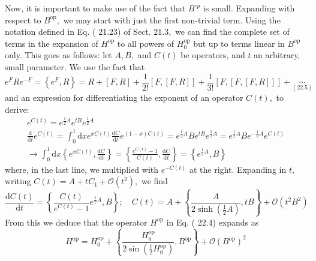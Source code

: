 \documentclass[main.tex]{subfiles}
\begin{document}
Now, it is important to make use of the fact that $B^{\circ p}$ is small. Expanding with respect to $B^{\mathrm{op}},$ we may start with just the first non-trivial term. Using the notation defined in Eq. ( 21.23) of Sect. $21.3,$ we can find the complete set of terms in the expansion of $H^{\mathrm{op}}$ to all powers of $H_{0}^{\mathrm{op}}$ but up to terms linear in $B^{\mathrm{op}}$ only. This goes as follows: let $A, B,$ and $C(t)$ be operators, and $t$ an arbitrary, small parameter. We use the fact that
$$
e^{F} R e^{-F}=\left\{e^{F}, R\right\}=R+[F, R]+\frac{1}{2 !}[F,[F, R]]+\frac{1}{3 !}[F,[F,[F, R]]]+\underset{(22.5)}{\cdots}
$$
and an expression for differentiating the exponent of an operator $C(t),$ to derive:
$$
\begin{array}{l}
{e^{C(t)}=e^{\frac{1}{2} A} e^{t B} e^{\frac{1}{2} A}} \\
{\frac{\mathrm{d}}{\mathrm{d} t} e^{C(t)}=\int_{0}^{1} \mathrm{d} x e^{x C(t)} \frac{\mathrm{d} C}{\mathrm{d} t} e^{(1-x) C(t)}=e^{\frac{1}{2} A} B e^{t B} e^{\frac{1}{2} A}=e^{\frac{1}{2} A} B e^{-\frac{1}{2} A} e^{C(t)}} \\
{\rightarrow \int_{0}^{1} \mathrm{d} x\left\{e^{x C(t)}, \frac{\mathrm{d} C}{\mathrm{d} t}\right\}=\left\{\frac{e^{C(t)}-1}{C(t)}, \frac{\mathrm{d} C}{\mathrm{d} t}\right\}=\left\{e^{\frac{1}{2} A}, B\right\}}
\end{array}
$$
where, in the last line, we multiplied with $e^{-C(t)}$ at the right. Expanding in $t,$ writing $C(t)=A+t C_{1}+\mathcal{O}\left(t^{2}\right),$ we find
$$
\frac{\mathrm{d} C(t)}{\mathrm{d} t}=\left\{\frac{C(t)}{e^{C(t)}-1} e^{\frac{1}{2} A}, B\right\} ; \quad C(t)=A+\left\{\frac{A}{2 \sinh \left(\frac{1}{2} A\right)}, t B\right\}+\mathcal{O}\left(t^{2} B^{2}\right)
$$
From this we deduce that the operator $H^{\mathrm{op}}$ in Eq. ( 22.4) expands as
$$
H^{\mathrm{op}}=H_{0}^{\mathrm{op}}+\left\{\frac{H_{0}^{\mathrm{op}}}{2 \sin \left(\frac{1}{2} H_{0}^{\mathrm{op}}\right)}, B^{\mathrm{op}}\right\}+\mathcal{O}\left(B^{\mathrm{op}}\right)^{2}
$$
\end{document}
